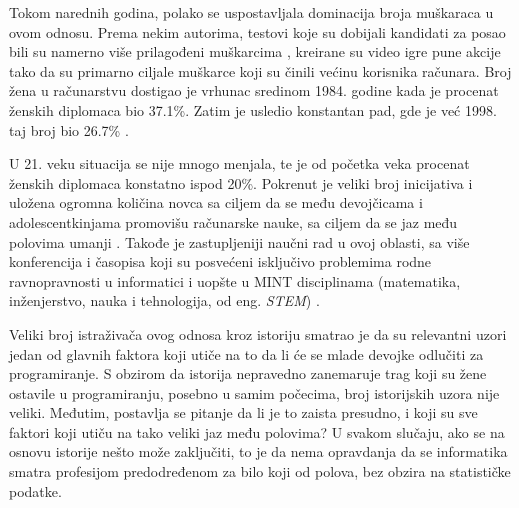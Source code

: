 {\sloppy
Tokom narednih godina, polako se uspostavljala dominacija broja mu\-ška\-raca u ovom odnosu. Prema nekim autorima, testovi koje su dobijali kandidati za posao bili su namerno više prilagođeni muškarcima \cite{frink}, kreirane su video igre pune akcije tako da su primarno ciljale muškarce koji su činili većinu korisnika računara. Broj žena u računarstvu dostigao je vrhunac sredinom 1984. godine kada je procenat ženskih diplomaca bio 37.1\%. Zatim je usledio konstantan pad, gde je već 1998. taj broj bio 26.7\% \cite{camp}.}

U 21. veku situacija se nije mnogo menjala, te je od početka veka procenat ženskih diplomaca konstatno ispod 20\%. Pokrenut je veliki broj inicijativa i uložena ogromna količina novca sa ciljem da se među devojčicama i adolescentkinjama promovišu računarske nauke, sa ciljem da se jaz među polovima umanji \cite{aei}. Takođe je zastupljeniji naučni rad u ovoj oblasti, sa više konferencija i časopisa koji su posvećeni isključivo problemima rodne ravnopravnosti u informatici i uopšte u MINT disciplinama (matematika, inženjerstvo, nauka i tehnologija, od eng. \emph{STEM}) \cite{soe-yakura}.

Veliki broj istraživača ovog odnosa kroz istoriju smatrao je da su relevantni uzori jedan od glavnih faktora koji utiče na to da li će se mlade devojke odlučiti za programiranje. S obzirom da istorija nepravedno zanemaruje trag koji su žene ostavile u programiranju, posebno u samim počecima, broj istorijskih uzora nije veliki. Međutim, postavlja se pitanje da li je to zaista presudno, i koji su sve faktori koji utiču na tako veliki jaz među polovima? U svakom slučaju, ako se na osnovu istorije nešto može zaključiti, to je da nema opravdanja da se informatika smatra profesijom predodređenom za bilo koji od polova, bez obzira na statističke podatke.